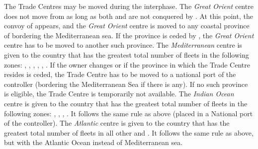 \aparag The Trade Centres may be moved during the interphase.
\aparag The \emph{Great Orient} centre does not move from 
as long as both  and  are not conquered by \TUR.
\bparag At this point, the convoy of  appears, and the
\emph{Great Orient} centre is moved to any coastal province of
 bordering the Mediterranean sea.
\bparag If the province is ceded by \TUR, the \emph{Great Orient} centre has
to be moved to another such province.
\aparag The \emph{Mediterranean} centre is given to the country that has the
greatest total number of fleets in the following zones: ,
, , , , .
\bparag If the owner changes or if the province in which the Trade Centre
resides is ceded, the Trade Centre has to be moved to a national port of the
controller (bordering the Mediterranean Sea if there is any).
\bparag If no such province is eligible, the Trade Centre is temporarily not
available.
\aparag The \emph{Indian Ocean} centre is given to the country that has the
greatest total number of fleets in the following zones: ,
, , .
\bparag It follows the same rule as above (placed in a National port of the
controller).
\aparag The \emph{Atlantic} centre is given to the country that has the
greatest total number of fleets in all other \STZ and \CTZ.
\bparag It follows the same rule as above, but with the Atlantic Ocean instead
of Mediterranean sea.

